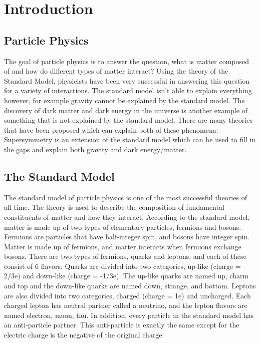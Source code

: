 \chapter{Introduction}
\label{ch:intro}

\section{Particle Physics}
The goal of particle physics is to answer the question, what is matter composed of and how do different types of matter interact?
Using the theory of the Standard Model, physicists have been very successful in answering this question for a variety of interactions.
The standard model isn't able to explain everything however, for example gravity cannot be explained by the standard model.
The discovery of dark matter and dark energy in the universe is another example of something that is not explained by the standard model.
There are many theories that have been proposed which can explain both of these phenomena.
Supersymmetry is an extension of the standard model which can be used to fill in the gaps and explain both gravity and dark energy/matter.

\section{The Standard Model}
The standard model of particle physics is one of the most successful theories of all time.
The theory is used to describe the composition of fundamental constituents of matter and how they interact.
According to the standard model, matter is made up of two types of elementary particles, fermions and bosons.
Fermions are particles that have half-integer spin, and bosons have integer spin.
Matter is made up of fermions, and matter interacts when fermions exchange bosons.
There are two types of fermions, quarks and leptons, and each of these consist of 6 flavors.
Quarks are divided into two categories, up-like (charge = 2/3e) and down-like (charge = -1/3e).
The up-like quarks are named up, charm and top and the down-like quarks are named down, strange, and bottom.
Leptons are also divided into two categories, charged (charge = 1e) and uncharged.
Each charged lepton has neutral partner called a neutrino, and the lepton flavors are named electron, muon, tau.
In addition, every particle in the standard model has an anti-particle partner.
This anti-particle is exactly the same except for the electric charge is the negative of the original charge.

